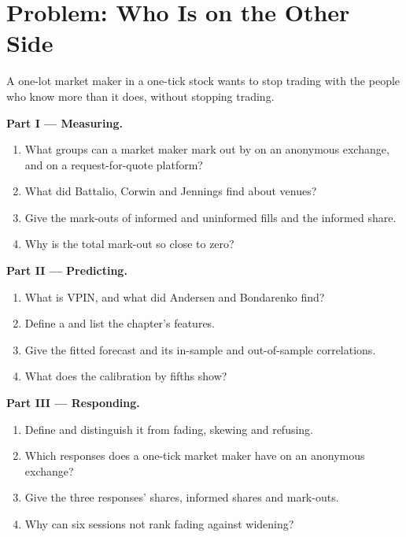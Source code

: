 \section{Problem: Who Is on the Other Side}

\begin{problem}\label{pb:hf:adverse-selection-and-toxicity:1}
A one-lot market maker in a one-tick stock wants to stop trading with the people who know more than it does, without stopping trading.

\medskip\noindent\textbf{Part I --- Measuring.}
\begin{enumerate}
\item What groups can a market maker mark out by on an anonymous exchange, and on a request-for-quote platform?
\item What did Battalio, Corwin and Jennings find about venues?
\item Give the mark-outs of informed and uninformed fills and the informed share.
\item Why is the total mark-out so close to zero?
\end{enumerate}

\medskip\noindent\textbf{Part II --- Predicting.}
\begin{enumerate}[resume]
\item What is VPIN, and what did Andersen and Bondarenko find?
\item Define a  and list the chapter's features.
\item Give the fitted forecast and its in-sample and out-of-sample correlations.
\item What does the calibration by fifths show?
\end{enumerate}

\medskip\noindent\textbf{Part III --- Responding.}
\begin{enumerate}[resume]
\item Define  and distinguish it from fading, skewing and refusing.
\item Which responses does a one-tick market maker have on an anonymous exchange?
\item Give the three responses' shares, informed shares and mark-outs.
\item Why can six sessions not rank fading against widening?
\end{enumerate}


\end{problem}
